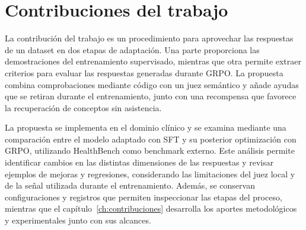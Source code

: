 \section{Contribuciones del trabajo}

La contribución del trabajo es un procedimiento para aprovechar las respuestas de un dataset en dos etapas de adaptación. Una parte proporciona las demostraciones del entrenamiento supervisado, mientras que otra permite extraer criterios para evaluar las respuestas generadas durante GRPO. La propuesta combina comprobaciones mediante código con un juez semántico y añade ayudas que se retiran durante el entrenamiento, junto con una recompensa que favorece la recuperación de conceptos sin asistencia.

La propuesta se implementa en el dominio clínico y se examina mediante una comparación entre el modelo adaptado con SFT y su posterior optimización con GRPO, utilizando HealthBench como benchmark externo. Este análisis permite identificar cambios en las distintas dimensiones de las respuestas y revisar ejemplos de mejoras y regresiones, considerando las limitaciones del juez local y de la señal utilizada durante el entrenamiento. Además, se conservan configuraciones y registros que permiten inspeccionar las etapas del proceso, mientras que el capítulo~\ref{ch:contribuciones} desarrolla los aportes metodológicos y experimentales junto con sus alcances.
